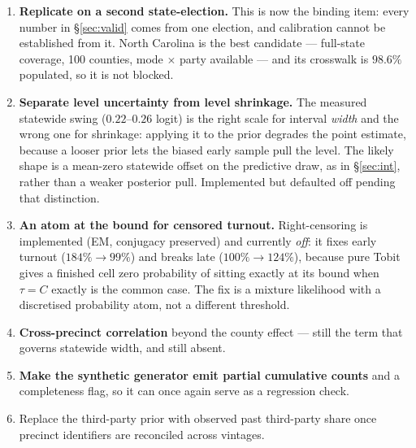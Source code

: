 \documentclass[11pt]{article}
\begin{document}
\begin{enumerate}
  \item \textbf{Replicate on a second state-election.} This is now the binding item: every
        number in \S\ref{sec:valid} comes from one election, and calibration cannot be
        established from it. North Carolina is the best candidate --- full-state coverage,
        100 counties, mode $\times$ party available --- and its crosswalk is $98.6\%$
        populated, so it is not blocked.
  \item \textbf{Separate level uncertainty from level shrinkage.} The measured statewide
        swing ($0.22$--$0.26$ logit) is the right scale for interval \emph{width} and the
        wrong one for shrinkage: applying it to the prior degrades the point estimate,
        because a looser prior lets the biased early sample pull the level. The likely
        shape is a mean-zero statewide offset on the predictive draw, as in
        \S\ref{sec:int}, rather than a weaker posterior pull. Implemented but defaulted
        off pending that distinction.
  \item \textbf{An atom at the bound for censored turnout.} Right-censoring is implemented
        (EM, conjugacy preserved) and currently \emph{off}: it fixes early turnout
        ($184\% \to 99\%$) and breaks late ($100\% \to 124\%$), because pure Tobit gives a
        finished cell zero probability of sitting exactly at its bound when $\tau = C$
        exactly is the common case. The fix is a mixture likelihood with a discretised
        probability atom, not a different threshold.
  \item \textbf{Cross-precinct correlation} beyond the county effect --- still the term
        that governs statewide width, and still absent.
  \item \textbf{Make the synthetic generator emit partial cumulative counts} and a
        completeness flag, so it can once again serve as a regression check.
  \item Replace the third-party prior with observed past third-party share once precinct
        identifiers are reconciled across vintages.
\end{enumerate}
\end{document}
